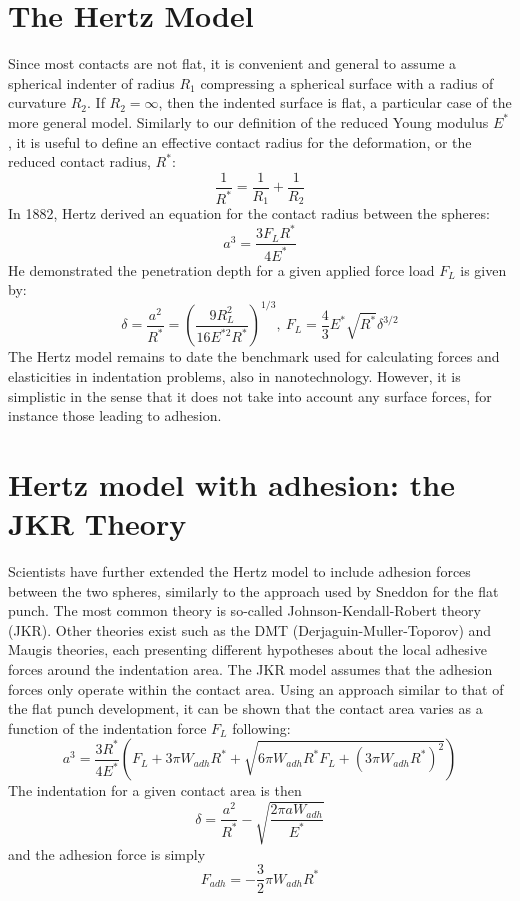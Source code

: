 \documentclass[a4paper, 11pt, normalem]{report}
\begin{document}
\section{The Hertz Model}
Since most contacts are not flat, it is convenient and general to assume a spherical indenter of radius $R_1$ compressing a spherical surface with a radius of curvature $R_2$.
If $R_2 = \infty$, then the indented surface is flat, a particular case of the more general model.
Similarly to our definition of the reduced Young modulus $E^*$, it is useful to define an effective contact radius for the deformation, or the reduced contact radius, $R^*$:
\begin{equation}
    \frac{1}{R^*} = \frac{1}{R_1} + \frac{1}{R_2}
\end{equation}
In 1882, Hertz derived an equation for the contact radius between the spheres:
\begin{equation}
    a^3 = \frac{3F_LR^*}{4E^*}
\end{equation}
He demonstrated the penetration depth for a given applied force load $F_L$ is given by:
\begin{equation}
    \delta = \frac{a^2}{R^*} =  \left(\frac{9R_L^2}{16E^{*2}R^*}\right)^{1/3},~ F_L = \frac43 E^*\sqrt{R^*} \delta^{3/2}
\end{equation}
The Hertz model remains to date the benchmark used for calculating forces and elasticities in indentation problems, also in nanotechnology.
However, it is simplistic in the sense that it does not take into account any surface forces, for instance those leading to adhesion.

\section{Hertz model with adhesion: the JKR Theory}
Scientists have further extended the Hertz model to include adhesion forces between the two spheres, similarly to the approach used by Sneddon for the flat punch.
The most common theory is so-called Johnson-Kendall-Robert theory (JKR).
Other theories exist such as the DMT (Derjaguin-Muller-Toporov) and Maugis theories, each presenting different hypotheses about the local adhesive forces around the indentation area.
The JKR model assumes that the adhesion forces only operate within the contact area.
Using an approach similar to that of the flat punch development, it can be shown that the contact area varies as a function of the indentation force $F_L$ following:
\begin{equation}
    a^3 = \frac{3R^*}{4E^*}\left(F_L + 3\pi W_{adh}R^* + \sqrt{6\pi W_{adh}R^*F_L + (3\pi W_{adh}R^*)^2}\right)
\end{equation}
The indentation for a given contact area is then
\begin{equation}
    \delta = \frac{a^2}{R^*} - \sqrt{\frac{2\pi aW_{adh}}{E^*}}
\end{equation}
and the adhesion force is simply
\begin{equation}
    F_{adh} = -\frac32 \pi W_{adh}R^*
\end{equation}
\end{document}
